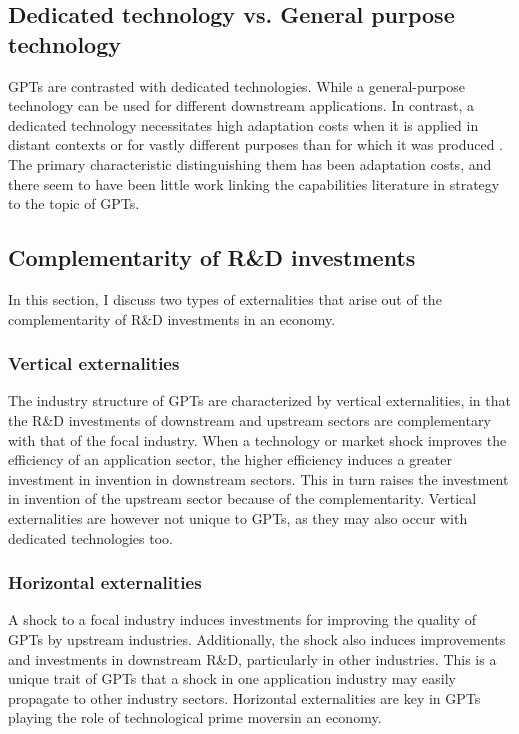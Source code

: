 \documentclass[12pt,letterpaper]{article}
\begin{document}
\subsection{Dedicated technology vs. General purpose technology}
GPTs are contrasted with dedicated technologies. While a general-purpose technology can be used for different downstream applications. In contrast, a dedicated technology necessitates high adaptation costs when it is applied in distant contexts or for vastly different purposes than for which it was produced \citep{Rosenberg2004}. The primary characteristic distinguishing them has been adaptation costs, and there seem to have been little work linking the capabilities literature in strategy to the topic of GPTs.

\subsection{Complementarity of R\&D investments}
In this section, I discuss two types of externalities that arise out of the complementarity of R\&D investments in an economy.
\subsubsection{Vertical externalities}
The industry structure of GPTs are characterized by vertical externalities, in that the R\&D investments of downstream and upstream sectors are complementary with that of the focal industry. When a technology or market shock improves the efficiency of an
application sector, the higher efficiency induces a greater investment in invention in downstream sectors. This in turn raises the investment in invention of the upstream sector because of the complementarity. Vertical externalities are however not unique to GPTs, as they may also occur with dedicated technologies too.

\subsubsection{Horizontal externalities}
A shock to a focal industry induces investments for improving the quality of GPTs by upstream industries. Additionally, the shock also induces improvements and investments in downstream R\&D, particularly in other industries. This is a unique trait of GPTs that a shock in one application industry may easily propagate to other industry sectors. Horizontal externalities are key in GPTs playing the role of \textquotesingle technological prime movers\textquotesingle in an economy.
\end{document}
